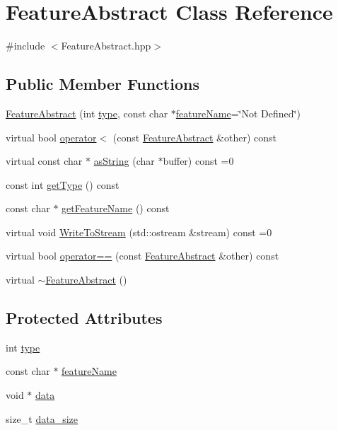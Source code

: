 \hypertarget{class_feature_abstract}{\section{Feature\+Abstract Class Reference}
\label{class_feature_abstract}
}


{\ttfamily \#include $<$Feature\+Abstract.\+hpp$>$}

\subsection*{Public Member Functions}
\begin{DoxyCompactItemize}
\item 
\hyperlink{class_feature_abstract_afb925654d107910da20b213080e8a013}{Feature\+Abstract} (int \hyperlink{class_feature_abstract_acab3574e41f892ae811b4adac8f5840a}{type}, const char $\ast$\hyperlink{class_feature_abstract_ae11ff57d87c0e49cf1cf95d71f407979}{feature\+Name}=\char`\"{}Not Defined\char`\"{})
\item 
virtual bool \hyperlink{class_feature_abstract_a88fb78d10c6f5395c88ff0ae23fe8b8f}{operator$<$} (const \hyperlink{class_feature_abstract}{Feature\+Abstract} \&other) const 
\item 
virtual const char $\ast$ \hyperlink{class_feature_abstract_af9ffe853716e6a28135ae1c33fafeafd}{as\+String} (char $\ast$buffer) const =0
\item 
const int \hyperlink{class_feature_abstract_a4cb21d5a97d7f537cda3c919c266a6cf}{get\+Type} () const 
\item 
const char $\ast$ \hyperlink{class_feature_abstract_a4b12b0d228da1c7e21429f263bef004e}{get\+Feature\+Name} () const 
\item 
virtual void \hyperlink{class_feature_abstract_a43cad67d17b3f23f1687862526126a1b}{Write\+To\+Stream} (std\+::ostream \&stream) const =0
\item 
virtual bool \hyperlink{class_feature_abstract_a8a2253d5e532ba6c95fe3653558c30c5}{operator==} (const \hyperlink{class_feature_abstract}{Feature\+Abstract} \&other) const 
\item 
virtual \hyperlink{class_feature_abstract_ad4a51a8818f23596fc88ef89a79ff125}{$\sim$\+Feature\+Abstract} ()
\end{DoxyCompactItemize}
\subsection*{Protected Attributes}
\begin{DoxyCompactItemize}
\item 
int \hyperlink{class_feature_abstract_acab3574e41f892ae811b4adac8f5840a}{type}
\item 
const char $\ast$ \hyperlink{class_feature_abstract_ae11ff57d87c0e49cf1cf95d71f407979}{feature\+Name}
\item 
void $\ast$ \hyperlink{class_feature_abstract_a088a09441e0d60ad556c37910e51e8a6}{data}
\item 
size\+\_\+t \hyperlink{class_feature_abstract_a99b0e94ca4cdf08688924517946b5743}{data\+\_\+size}
\end{DoxyCompactItemize}
